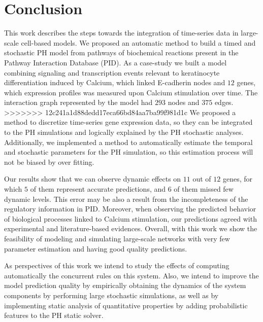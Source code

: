\section{Conclusion}
This work describes the steps towards the integration of time-series data in large-scale cell-based models. 
We proposed an automatic method to build a timed and stochastic PH model from pathways of biochemical reactions present in 
the Pathway Interaction Database (PID). 
%
As a case-study we built a model combining signaling and transcription events relevant to keratinocyte differentiation induced by Calcium, which linked E-cadherin nodes and $12$ genes, which 
expression profiles was measured upon Calcium stimulation over time. The interaction graph represented by the model had $293$ nodes and $375$ edges.
>>>>>>> 12c241a1d88dedd17eca66bd84aa7ba99f981d1c
%
We proposed a method to discretize time-series gene expression data, so they can be integrated to the PH simulations and logically explained by the PH stochastic analyses. 
%
Additionally, we implemented a method to automatically estimate the temporal and stochastic
parameters for the PH simulation, so this estimation process will not be biased by over fitting. 
%

Our results show that  we can observe dynamic effects on $11$ out of $12$ genes, for which $5$ of them represent accurate predictions, and $6$ of them missed few dynamic levels.
This error may be also a result from the incompleteness of the regulatory information in PID.
Moreover, when observing the predicted behavior of biological processes linked to Calcium stimulation, our predictions agreed with experimental and literature-based evidences.
Overall, with this work we show the feasibility of modeling and simulating large-scale networks with very few parameter estimation 
and having good quality predictions.

As perspectives of this work we intend to study the effects of computing automatically the concurrent rules on this system.
Also, we intend to improve the model prediction quality by empirically obtaining the dynamics of the system components by performing large stochastic simulations, as well 
as by implementing static analysis of quantitative properties by adding probabilistic features to the PH static solver.

